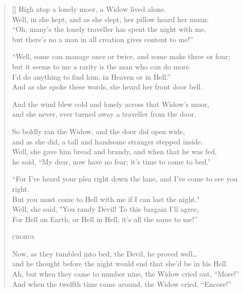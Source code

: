 \pagebreak
\settowidth{\versewidth}{Well, in she kept, and as she slept, her pillow heard her moan:}
\begin{verse}[\versewidth]
High atop a lonely moor, a Widow lived alone.\\
Well, in she kept, and as she slept, her pillow heard her moan:\\
``Oh, many's the lonely traveller has spent the night with me,\\
but there's no a man in all creation gives content to me!''

``Well, some can manage once or twice, and some make three or four;\\
but it seems to me a rarity is the man who can do more.\\
I'd do anything to find him, in Heaven or in Hell.''\\
And as she spoke these words, she heard her front door bell.

\begin{chorus}
And the wind blew cold and lonely across that Widow's moor,\\
and she never, ever turned away a traveller from the door.
\end{chorus}

So boldly ran the Widow, and the door did open wide,\\
and as she did, a tall and handsome stranger stepped inside.\\
Well, she gave him bread and brandy, and when that he was fed,\\
he said, ``My dear, now have no fear; it's time to come to bed.''

``For I've heard your plea right down the lane, and I've come to see you right.\\
But you must come to Hell with me if I can last the night."\\
Well, she said, "You randy Devil! To this bargain I'll agree,\\
For Hell on Earth, or Hell in Hell, it's all the same to me!''

\textsc{chorus}

Now, as they tumbled into bed, the Devil, he proved well\dots\\
and he thought before the night would end that she'd be in his Hell.\\
Ah, but when they came to number nine, the Widow cried out, ``More!''\\
And when the twelfth time came around, the Widow cried, ``Encore!''


\end{verse}
